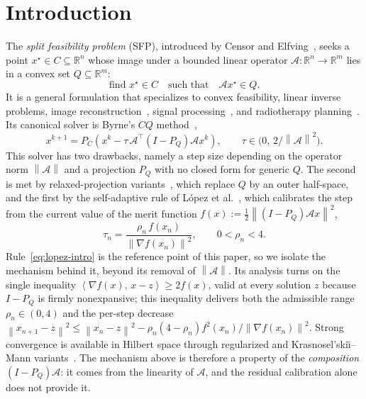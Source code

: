 \documentclass[]{interact}
\theoremstyle{plain}
\theoremstyle{definition}
\theoremstyle{remark}
\newcommand{\R}{\mathbb{R}}
\newcommand{\norm}[1]{\left\lVert #1 \right\rVert}
\newcommand{\inner}[2]{\left\langle #1,\, #2 \right\rangle}
\begin{document}
\section{Introduction}\label{sec:intro}

The \emph{split feasibility problem} (SFP), introduced by Censor and Elfving~\citep{censor1994}, seeks a point $x^\star\in C\subseteq\R^n$ whose image under a bounded linear operator $\mathcal{A}:\R^n\to\R^m$ lies in a convex set $Q\subseteq\R^m$:
\begin{equation}\label{eq:sfp-intro}
\text{find } x^\star\in C \quad\text{such that}\quad \mathcal{A}x^\star\in Q .
\end{equation}
It is a general formulation that specializes to convex feasibility, linear inverse problems, image reconstruction~\citep{byrne2002}, signal processing~\citep{combettes2011}, and radiotherapy planning~\citep{censor2006}. Its canonical solver is Byrne's $CQ$ method~\citep{byrne2002},
\begin{equation}\label{eq:cq-intro}
x^{k+1}=P_C\!\left(x^k-\tau\,\mathcal{A}^{\top}(I-P_Q)\mathcal{A}x^k\right),
\qquad \tau\in\bigl(0,\,2/\norm{\mathcal{A}}^2\bigr).
\end{equation}
This solver has two drawbacks, namely a step size depending on the operator norm $\norm{\mathcal{A}}$ and a projection $P_Q$ with no closed form for generic $Q$. The second is met by relaxed-projection variants~\citep{fukushima1986,yang2004}, which replace $Q$ by an outer half-space, and the first by the self-adaptive rule of L\'opez et al.~\citep{lopez2012}, which calibrates the step from the current value of the merit function $f(x):=\tfrac12\norm{(I-P_Q)\mathcal{A}x}^2$,
\begin{equation}\label{eq:lopez-intro}
\tau_n=\frac{\rho_n\,f(x_n)}{\norm{\nabla f(x_n)}^2},\qquad 0<\rho_n<4 .
\end{equation}
Rule~\eqref{eq:lopez-intro} is the reference point of this paper, so we isolate the mechanism behind it, beyond its removal of $\norm{\mathcal{A}}$. Its analysis turns on the single inequality $\inner{\nabla f(x)}{x-z}\ge 2f(x)$, valid at every solution $z$ because $I-P_Q$ is firmly nonexpansive; this inequality delivers both the admissible range $\rho_n\in(0,4)$ and the per-step decrease $\norm{x_{n+1}-z}^2\le\norm{x_n-z}^2-\rho_n(4-\rho_n)f^2(x_n)/\norm{\nabla f(x_n)}^2$. Strong convergence is available in Hilbert space through regularized and Krasnosel'ski\u{\i}--Mann variants~\citep{xu2010}. The mechanism above is therefore a property of the \emph{composition} $(I-P_Q)\mathcal{A}$: it comes from the linearity of $\mathcal{A}$, and the residual calibration alone does not provide it.
\end{document}
